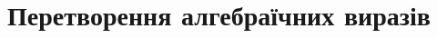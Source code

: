 \documentclass{book}
\begin{document}
\chapter{Перетворення алгебраїчних виразів}

\begin{comment}




\chapter{Перетворення виразів з показниками і логарифмами}






\end{comment}
\end{document}
